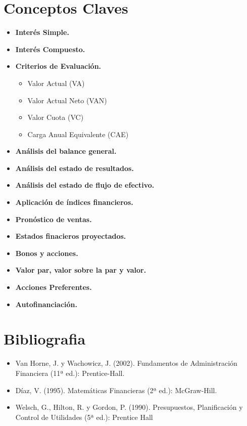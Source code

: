 \documentclass{templateNote}
\begin{document}

\portada
\margenes %

\section{Conceptos Claves}
\begin{itemize}
    \item \textbf{Interés Simple.}
    \item \textbf{Interés Compuesto.}
    \item \textbf{Criterios de Evaluación.}
    \begin{itemize}
        \item Valor Actual (VA)
        \item Valor Actual Neto (VAN)
        \item Valor Cuota (VC)
        \item Carga Anual Equivalente (CAE)
    \end{itemize}
    \item \textbf{Análisis del balance general.}
    \item \textbf{Análisis del estado de resultados.}
    \item \textbf{Análisis del estado de flujo de efectivo.}
    \item \textbf{Aplicación de índices financieros.}
    \item \textbf{Pronóstico de ventas.}
    \item \textbf{Estados finacieros proyectados.}
    \item \textbf{Bonos y acciones.}
    \item \textbf{Valor par, valor sobre la par y valor.}
    \item \textbf{Acciones Preferentes.}
    \item \textbf{Autofinanciación.}
\end{itemize}

\section{Bibliografia}
\begin{itemize}
    \item Van Horne, J. y Wachowicz, J. (2002). Fundamentos de Administración Financiera (11ª ed.): Prentice-Hall.
    \item Díaz, V. (1995). Matemáticas Financieras (2ª ed.): McGraw-Hill.
    \item Welsch, G., Hilton, R. y Gordon, P. (1990). Presupuestos, Planificación y Control de Utilidades (5ª ed.): Prentice Hall
\end{itemize}
\end{document}
